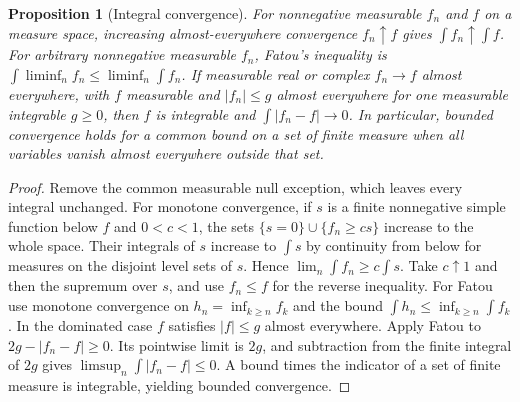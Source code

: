 \documentclass[11pt,oneside,openany]{book}
\theoremstyle{plain}
\newtheorem{proposition}[theorem]{Proposition}
\theoremstyle{definition}
\theoremstyle{remark}
\begin{document}
\begin{proposition}[Integral convergence]
\label{thm:prob-integral-convergence}
For nonnegative measurable \(f_n\) and \(f\) on a measure space,
increasing almost-everywhere convergence \(f_n\uparrow f\) gives
\(\int f_n\uparrow\int f\). For arbitrary nonnegative measurable
\(f_n\), Fatou's inequality is
\(\int\liminf_n f_n\le\liminf_n\int f_n\).
If measurable real or complex \(f_n\to f\) almost everywhere, with
\(f\) measurable and \(|f_n|\le g\) almost everywhere for one
measurable integrable \(g\ge0\), then
\(f\) is integrable and \(\int |f_n-f|\to0\). In particular, bounded
convergence holds for a common bound on a set of finite measure when
all variables vanish almost everywhere outside that set.
\end{proposition}
\begin{proof}
Remove the common measurable null exception, which leaves every
integral unchanged. For monotone convergence, if \(s\) is a finite
nonnegative simple function below \(f\) and \(0<c<1\), the sets
\(\{s=0\}\cup\{f_n\ge c s\}\) increase to the whole space.
Their integrals of \(s\) increase to \(\int s\) by continuity from
below for measures on the disjoint level sets of \(s\). Hence
\(\lim_n\int f_n\ge c\int s\). Take \(c\uparrow1\) and then the
supremum over \(s\), and use \(f_n\le f\) for the reverse inequality.
For Fatou use monotone convergence on \(h_n=\inf_{k\ge n} f_k\)
and the bound \(\int h_n\le\inf_{k\ge n}\int f_k\).
In the dominated case \(f\) satisfies \(|f|\le g\) almost
everywhere. Apply Fatou to \(2g-|f_n-f|\ge0\). Its pointwise limit is
\(2g\), and subtraction from the finite integral of \(2g\) gives
\(\limsup_n\int |f_n-f|\le0\). A bound times the indicator of a set
of finite measure is integrable, yielding bounded convergence.
\end{proof}
\end{document}
